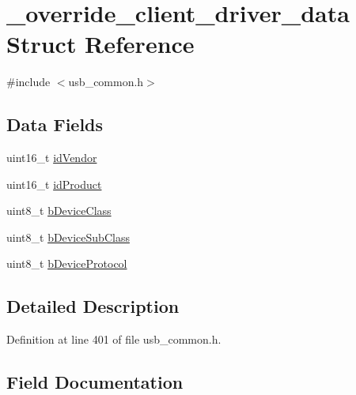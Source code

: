 \hypertarget{struct__override__client__driver__data}{}\section{\+\_\+override\+\_\+client\+\_\+driver\+\_\+data Struct Reference}
\label{struct__override__client__driver__data}


{\ttfamily \#include $<$usb\+\_\+common.\+h$>$}

\subsection*{Data Fields}
\begin{DoxyCompactItemize}
\item 
uint16\+\_\+t \mbox{\hyperlink{struct__override__client__driver__data_ab393e07556e3858fed36ed2e260d4b4c}{id\+Vendor}}
\item 
uint16\+\_\+t \mbox{\hyperlink{struct__override__client__driver__data_a2cf29745398a958349d784b1911c6b2b}{id\+Product}}
\item 
uint8\+\_\+t \mbox{\hyperlink{struct__override__client__driver__data_ab8e1b1fca77a607c39bba2278623d4f4}{b\+Device\+Class}}
\item 
uint8\+\_\+t \mbox{\hyperlink{struct__override__client__driver__data_a260eec0b4e7279e6ecae808ca34c2604}{b\+Device\+Sub\+Class}}
\item 
uint8\+\_\+t \mbox{\hyperlink{struct__override__client__driver__data_a44e204b5f7158f4048edcb944351ce27}{b\+Device\+Protocol}}
\end{DoxyCompactItemize}


\subsection{Detailed Description}


Definition at line 401 of file usb\+\_\+common.\+h.



\subsection{Field Documentation}
\mbox{\label{struct__override__client__driver__data_ab8e1b1fca77a607c39bba2278623d4f4}} 
